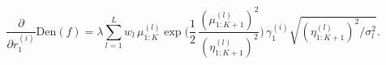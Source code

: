 \begin{equation}
    \frac{\partial}{\partial r_1^{(i)}} \text{Den}(f) = \lambda \sum_{l=1}^L w_l \, \mu^{(l)}_{1:K} \exp \bigg( \frac{1}{2} \, \frac{(\mu^{(l)}_{1:K+1})^2}{(\eta^{(l)}_{1:K+1})^2} \bigg) \, \gamma_1^{(i)} \sqrt{(\eta^{(l)}_{1:K+1})^2 / \sigma_l^2}.
\end{equation}




